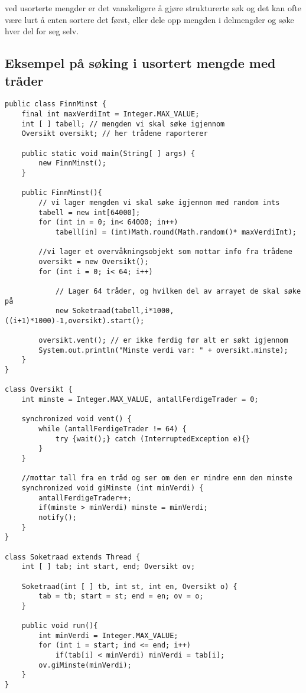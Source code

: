 \documentclass[11pt]{article}
\begin{document}
  ved usorterte mengder er det vanskeligere å gjøre strukturerte søk og det kan ofte
  være lurt å enten sortere det først, eller dele opp mengden i delmengder og søke hver
  del for seg selv.
\subsection{Eksempel på søking i usortert mengde med tråder}
\label{sec-11-1}



\begin{verbatim}
public class FinnMinst {
    final int maxVerdiInt = Integer.MAX_VALUE;
    int [ ] tabell; // mengden vi skal søke igjennom
    Oversikt oversikt; // her trådene raporterer

    public static void main(String[ ] args) {
        new FinnMinst();
    }

    public FinnMinst(){
        // vi lager mengden vi skal søke igjennom med random ints
        tabell = new int[64000];
        for (int in = 0; in< 64000; in++) 
            tabell[in] = (int)Math.round(Math.random()* maxVerdiInt);

        //vi lager et overvåkningsobjekt som mottar info fra trådene
        oversikt = new Oversikt();
        for (int i = 0; i< 64; i++)

            // Lager 64 tråder, og hvilken del av arrayet de skal søke på
            new Soketraad(tabell,i*1000,((i+1)*1000)-1,oversikt).start(); 

        oversikt.vent(); // er ikke ferdig før alt er søkt igjennom
        System.out.println("Minste verdi var: " + oversikt.minste);
    }
}

class Oversikt {
    int minste = Integer.MAX_VALUE, antallFerdigeTrader = 0;  

    synchronized void vent() {
        while (antallFerdigeTrader != 64) {
            try {wait();} catch (InterruptedException e){}      
        }
    } 

    //mottar tall fra en tråd og ser om den er mindre enn den minste
    synchronized void giMinste (int minVerdi) {
        antallFerdigeTrader++;
        if(minste > minVerdi) minste = minVerdi;      
        notify();
    }
}

class Soketraad extends Thread {
    int [ ] tab; int start, end; Oversikt ov;

    Soketraad(int [ ] tb, int st, int en, Oversikt o) {
        tab = tb; start = st; end = en; ov = o; 
    }

    public void run(){
        int minVerdi = Integer.MAX_VALUE;     
        for (int i = start; ind <= end; i++)
            if(tab[i] < minVerdi) minVerdi = tab[i];
        ov.giMinste(minVerdi);
    } 
}
\end{verbatim}
\end{document}
